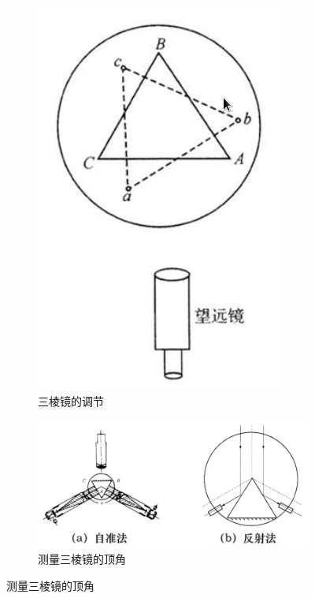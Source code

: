 \documentclass{article}
\begin{document}
\begin{figure}[H]
  \centering
  \begin{subfigure}{.25\textwidth}
    \centering
    \includegraphics[width=\linewidth]{figures/三棱镜的调节}
    \caption{三棱镜的调节}
  \end{subfigure}
  \begin{subfigure}{.7\textwidth}
    \centering
    \includegraphics[width=\linewidth]{figures/三棱镜顶角的测量}
    \caption{测量三棱镜的顶角}
  \end{subfigure}
\end{figure}
\end{document}
